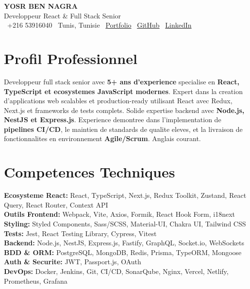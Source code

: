 \documentclass[10pt,a4paper]{article}
\begin{document}
\begin{center}
  {\Large\bfseries\color{primary} YOSR BEN NAGRA}\\[2pt]
  {\small\color{darkgray} Developpeur React \& Full Stack Senior}\\[3pt]
  {\footnotesize
    \faPhone\ +216 53916040 \quad
    \faMapMarker*\ Tunis, Tunisie \quad
    \faGlobe\ \href{https://portfolio-yosr.vercel.app/en}{Portfolio} \quad
    \faGithub\ \href{https://github.com/YosrBennagra}{GitHub} \quad
    \faLinkedin\ \href{https://www.linkedin.com/in/yosr-ben-nagra/}{LinkedIn}
  }
\end{center}

\vspace{3pt}

\section*{Profil Professionnel}
\vspace{1pt}
{\small
Developpeur full stack senior avec \textbf{5+ ans d'experience} specialise en \textbf{React, TypeScript et ecosystemes JavaScript modernes}. Expert dans la creation d'applications web scalables et production-ready utilisant React avec Redux, Next.js et frameworks de tests complets. Solide expertise backend avec \textbf{Node.js, NestJS et Express.js}. Experience demontree dans l'implementation de \textbf{pipelines CI/CD}, le maintien de standards de qualite eleves, et la livraison de fonctionnalites en environnement \textbf{Agile/Scrum}. Anglais courant.
}

\vspace{3pt}

\section*{Competences Techniques}
\vspace{2pt}
{\small
\textbf{Ecosysteme React:} React, TypeScript, Next.js, Redux Toolkit, Zustand, React Query, React Router, Context API\\[2pt]
\textbf{Outils Frontend:} Webpack, Vite, Axios, Formik, React Hook Form, i18next\\[2pt]
\textbf{Styling:} Styled Components, Sass/SCSS, Material-UI, Chakra UI, Tailwind CSS\\[2pt]
\textbf{Tests:} Jest, React Testing Library, Cypress, Vitest\\[2pt]
\textbf{Backend:} Node.js, NestJS, Express.js, Fastify, GraphQL, Socket.io, WebSockets\\[2pt]
\textbf{BDD \& ORM:} PostgreSQL, MongoDB, Redis, Prisma, TypeORM, Mongoose\\[2pt]
\textbf{Auth \& Securite:} JWT, Passport.js, OAuth\\[2pt]
\textbf{DevOps:} Docker, Jenkins, Git, CI/CD, SonarQube, Nginx, Vercel, Netlify, Prometheus, Grafana
}
\end{document}
